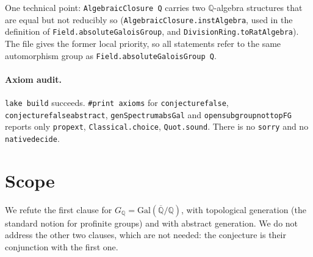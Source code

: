 \documentclass[11pt]{article}
\theoremstyle{definition}
\theoremstyle{remark}
\renewcommand{\_}{\oldus\allowbreak}
\newcommand{\Q}{\mathbb{Q}}
\newcommand{\Qb}{\overline{\mathbb{Q}}}
\newcommand{\GQ}{G_{\mathbb{Q}}}
\begin{document}
One technical point: \texttt{AlgebraicClosure Q} carries two $\Q$-algebra structures that are equal but not
reducibly so (\texttt{AlgebraicClosure.instAlgebra}, used in the definition of
\texttt{Field.absoluteGaloisGroup}, and \texttt{DivisionRing.toRatAlgebra}). The file gives the former local
priority, so all statements refer to the same automorphism group as \texttt{Field.absoluteGaloisGroup Q}.

\paragraph{Axiom audit.} \texttt{lake build} succeeds. \texttt{\#print axioms} for
\texttt{conjecture\_2416\_false}, \texttt{conjecture\_2416\_false\_abstract}, \texttt{genSpectrum\_absGal} and
\texttt{open\_subgroup\_not\_topFG} reports only \texttt{propext}, \texttt{Classical.choice}, \texttt{Quot.sound}.
There is no \texttt{sorry} and no \texttt{native\_decide}.

\section{Scope}
We refute the first clause for $\GQ=\mathrm{Gal}(\Qb/\Q)$, with topological generation (the standard notion for
profinite groups) and with abstract generation. We do not address the other two clauses, which are not needed:
the conjecture is their conjunction with the first one.
\end{document}
